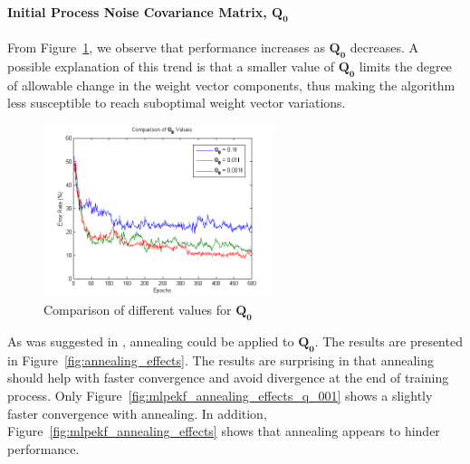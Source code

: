 \documentclass[11pt,letterpaper,titlepage]{article}
\numberwithin{equation}{section}
\numberwithin{figure}{section}
\numberwithin{table}{section}
\begin{document}
\paragraph{Initial Process Noise Covariance Matrix, \(\mathbf{Q_0}\)}
\label{sec:q_0}

From Figure~\ref{fig:mlpekf_compare_q_no_p10000}, we observe that performance increases as \(\mathbf{Q_0}\) decreases. A possible explanation of this trend is that a smaller value of \(\mathbf{Q_0}\) limits the degree of allowable change in the weight vector components, thus making the algorithm less susceptible to reach suboptimal weight vector variations.

\begin{figure}[H]
  \centering
  \includegraphics[width=0.6\textwidth]{img/mlpekf_compare_q_no_p10000}
  \caption{Comparison of different values for \(\mathbf{Q_0}\)}
  \label{fig:mlpekf_compare_q_no_p10000}
\end{figure}

As was suggested in \cite{Haykin2001}, annealing could be applied to \(\mathbf{Q_0}\). The results are presented in Figure~\ref{fig:annealing_effects}. The results are surprising in that annealing should help with faster convergence and avoid divergence at the end of training process. Only Figure~\ref{fig:mlpekf_annealing_effects_q_001} shows a slightly faster convergence with annealing. In addition, Figure~\ref{fig:mlpekf_annealing_effects} shows that annealing appears to hinder performance.
\end{document}
